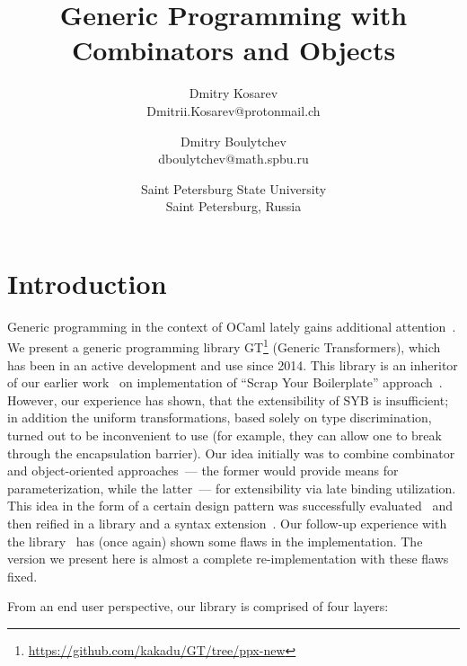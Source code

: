 \documentclass[twocolumn,8pt]{extarticle}
\begin{document}
\title{Generic Programming with
  Combinators and Objects}

\author{Dmitry Kosarev\\
  Dmitrii.Kosarev@protonmail.ch \and
  Dmitry Boulytchev \\
  dboulytchev@math.spbu.ru}

\date{Saint Petersburg State University\\ Saint Petersburg, Russia}

\maketitle

\section{Introduction}

Generic programming in the context of OCaml lately gains additional attention~\cite{Staged,Visitors,GenericOCaml}. 
We present a generic programming library GT\footnote{\url{https://github.com/kakadu/GT/tree/ppx-new}} (Generic Transformers), which has been in an active development and use since
2014. This library is an inheritor of our earlier work~\cite{SYBOCaml} on implementation of ``Scrap Your Boilerplate''
approach~\cite{SYB,SYB1,SYB2}. However, our experience has shown, that the extensibility of SYB is insufficient; in addition
the uniform transformations, based solely on type discrimination, turned out to be inconvenient to use (for example, they can allow
one to break through the encapsulation barrier). Our idea initially was to combine combinator and object-oriented approaches~--- the former
would provide means for parameterization, while the latter~--- for extensibility via late binding utilization. This idea in the form of
a certain design pattern was successfully evaluated~\cite{SCICO} and then reified in a library and a syntax extension~\cite{TransformationObjects}.
Our follow-up experience with the library~\cite{OCanren} has (once again) shown some flaws in the implementation. The version we present here is
almost a complete re-implementation with these flaws fixed.

From an end user perspective, our library is comprised of four layers:
\end{document}
